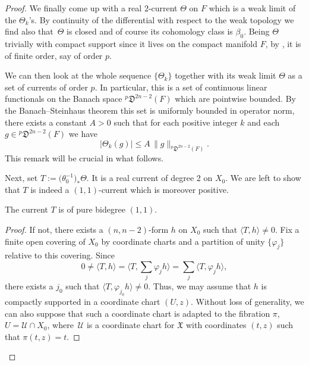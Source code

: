 \begin{appendix}
\begin{proof}
We finally come up with a real $2$-current $\Theta$ on $F$ which is a weak limit of the $\Theta_k$'s. By continuity of the differential with respect to the weak topology we find also that~$\Theta$ is closed and of course its cohomology class is $\beta_0$. Being $\Theta$ trivially with compact support since it lives on the compact manifold $F$, by \cite[Cor.\ on p.\,43]{dRh84}, it is of finite order, say of order $p$.

\begin{remark}\label{rk:BS}
We can then look at the whole sequence $\{\Theta_k\}$ together with its weak limit $\Theta$ as a set of currents of order $p$. In particular, this is a set of continuous linear functionals on the Banach space $^p\mathfrak D^{2n-2}(F)$ which are pointwise bounded. By the Banach--Steinhaus theorem this set is uniformly bounded in operator norm, \ie there exists a constant $A>0$ such that for each positive integer $k$ and each $g\in{}^p\mathfrak D^{2n-2}(F)$ we have
\[
|\Theta_k(g)|\le A\, \|g\|_{^p\mathfrak D^{2n-2}(F)}.
\]
This remark will be crucial in what follows.
\end{remark}

Next, set $T:=\bigl(\theta_0^{-1}\bigr)_*\Theta$. It is a real current of degree 2 on $X_0$. We are left to show that $T$ is indeed a $(1,1)$-current which is moreover positive.

\begin{proposition}
The current $T$ is of pure bidegree $(1,1)$.
\end{proposition}

\begin{proof}
If not, there exists a $(n,n-2)$-form $h$ on $X_0$ such that $\langle T,h\rangle\ne 0$. Fix a finite open covering of $X_0$ by coordinate charts and a partition of unity $\{\varphi_j\}$ relative to this covering. Since
\[
0\ne\langle T,h\rangle=\bigl\langle T,{\textstyle\sum_j\varphi_jh}\bigr\rangle=\sum_j\langle T,\varphi_jh\rangle,
\]
there exists a $j_0$ such that $\langle T,\varphi_{j_0}h\rangle\ne 0$. Thus, we may assume that $h$ is compactly supported in a coordinate chart $(U,z)$. Without loss of generality, we can also suppose that such a coordinate chart is adapted to the fibration $\pi$, \ie $U=\mathcal U\cap X_0$, where~$\mathcal U$ is a coordinate chart for $\mathfrak X$ with coordinates $(t,z)$ such that $\pi(t,z)=t$.


\end{proof}
\end{proof}
\end{appendix}
